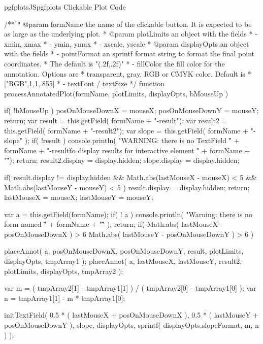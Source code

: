 {{\begin{insDLJS}[processAnnotatedPlot]{pgfplotsJS}{pgfplots Clickable Plot Code}
{}

/**
 * @param formName the name of the clickable button. It is expected to be as large as the underlying plot.
 * @param plotLimits an object with the fields
 *   - xmin, xmax
 *   - ymin, ymax
 *   - xscale, yscale
 * @param displayOpts an object with the fields
 *   - pointFormat an sprintf format string to format the final point coordinates.
 *   The default is  "(\pgfplotsPERCENT.2f,\pgfplotsPERCENT.2f)"
 *   - fillColor the fill color for the annotation. Options are
 *    transparent, gray, RGB or CMYK color. Default is
 *       ["RGB",1,1,.855]
 *	 - textFont / textSize
 */
function processAnnotatedPlot(formName, plotLimits, displayOpts, bMouseUp ) 
{
	if( !bMouseUp ) {
		posOnMouseDownX = mouseX;
		posOnMouseDownY = mouseY;
		return;
	}
	var result = this.getField( formName + "-result");
	var result2 = this.getField( formName + "-result2");
	var slope 	= this.getField( formName + "-slope" );
	if( !result ) {
		console.println( "WARNING: there is no TextField \"" + formName + "-result\" to display results for interactive element \"" + formName + "\"");
		return;
	}
	result2.display = display.hidden;
	slope.display = display.hidden;

	if( result.display != display.hidden && 
		Math.abs(lastMouseX - mouseX) < 5 &&
		Math.abs(lastMouseY - mouseY) < 5 ) 
	{
		result.display = display.hidden;
		return;
	}
	lastMouseX = mouseX;
	lastMouseY = mouseY;

	var a = this.getField(formName);
	if( ! a ) {
		console.println( "Warning: there is no form named \"" + formName + "\"" );
		return;
	}
	if( Math.abs( lastMouseX - posOnMouseDownX ) > 6 \pgfplotsVERTBAR\pgfplotsVERTBAR
		Math.abs( lastMouseY - posOnMouseDownY ) > 6 )
	{
		placeAnnot( a, posOnMouseDownX, posOnMouseDownY, result, plotLimits, displayOpts, tmpArray1 );
		placeAnnot( a, lastMouseX, lastMouseY, result2, plotLimits, displayOpts, tmpArray2 );

		var m =  ( tmpArray2[1] - tmpArray1[1] ) / ( tmpArray2[0] - tmpArray1[0] );
		var n =  tmpArray1[1] - m * tmpArray1[0];

		initTextField( 
			0.5 * ( lastMouseX + posOnMouseDownX ),
			0.5 * ( lastMouseY + posOnMouseDownY ),
			slope,
			displayOpts,
			sprintf( displayOpts.slopeFormat, m, n ) );


}}
\end{insDLJS}}}
